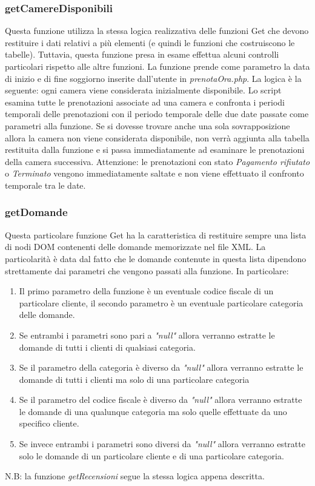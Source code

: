\documentclass [a4paper, 12pt]{book}
\begin{document}
\subsubsection{getCamereDisponibili}
Questa funzione utilizza la stessa logica realizzativa delle funzioni Get che devono restituire i dati relativi a più elementi (e quindi le funzioni che costruiscono le tabelle). Tuttavia, questa funzione presa in esame effettua alcuni controlli particolari rispetto alle altre funzioni. La funzione prende come parametro la data di inizio e di fine soggiorno inserite dall'utente in \textit{prenotaOra.php}. La logica è la seguente: ogni camera viene considerata inizialmente disponibile. Lo script esamina tutte le prenotazioni associate ad una camera e confronta i periodi temporali delle prenotazioni con il periodo temporale delle due date passate come parametri alla funzione. Se si dovesse trovare anche una sola sovrapposizione allora la camera non viene considerata disponibile, non verrà aggiunta alla tabella restituita dalla funzione e si passa immediatamente ad esaminare le prenotazioni della camera successiva. Attenzione: le prenotazioni con stato \textit{Pagamento rifiutato} o \textit{Terminato} vengono immediatamente saltate e non viene effettuato il confronto temporale tra le date.

\subsubsection{getDomande}
Questa particolare funzione Get ha la caratteristica di restituire sempre una lista di nodi DOM contenenti delle domande memorizzate nel file XML. La particolarità è data dal fatto che le domande contenute in questa lista dipendono strettamente dai parametri che vengono passati alla funzione. In particolare:
\begin{enumerate}
\item Il primo parametro della funzione è un eventuale codice fiscale di un particolare cliente, il secondo parametro è un eventuale particolare categoria delle domande.
\item Se entrambi i parametri sono pari a \textit{"null"} allora verranno estratte le domande di tutti i clienti di qualsiasi categoria.
\item Se il parametro della categoria è diverso da \textit{"null"} allora verranno estratte le domande di tutti i clienti ma solo di una particolare categoria
\item Se il parametro del codice fiscale è diverso da \textit{"null"} allora verranno estratte le domande di una qualunque categoria ma solo quelle effettuate da uno specifico cliente.
\item Se invece entrambi i parametri sono diversi da \textit{"null"} allora verranno estratte solo le domande di un particolare cliente e di una particolare categoria.
\end{enumerate}
N.B: la funzione \textit{getRecensioni} segue la stessa logica appena descritta.
\end{document}
